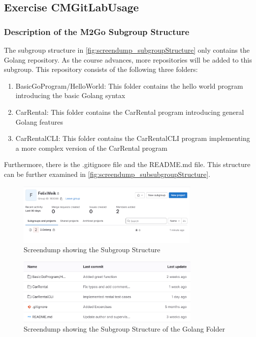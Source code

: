 \label{sec:exercise_cm_gitlab_usage}

\subsection{Exercise CMGitLabUsage}

\subsubsection*{Description of the M2Go Subgroup Structure}
The subgroup structure in \autoref{fig:screendump_subgroupStructure} only contains the Golang repository.
As the course advances, more repositories will be added to this subgroup.
This repository consists of the following three folders:
\begin{enumerate}
    \item BasicGoProgram/HelloWorld: This folder contains the hello world program introducing the basic Golang syntax
    \item CarRental: This folder contains the CarRental program introducing general Golang features
    \item CarRentalCLI: This folder contains the CarRentalCLI program implementing a more complex version of the CarRental program
\end{enumerate}
Furthermore, there is the .gitignore file and the README.md file.
This structure can be further examined in \autoref{fig:screendump_subsubgroupStructure}.

\begin{figure}[h]
    \centering
    \includegraphics[width=0.8\textwidth]{figures/goLang/golang_personalSubgroupStructure.png}
    \caption{Screendump showing the Subgroup Structure}
    \label{fig:screendump_subgroupStructure}
\end{figure}

\begin{figure}
    \centering
    \includegraphics[width=0.8\textwidth]{figures/goLang/golang_personalSubsubgroupStructure.png}
    \caption{Screendump showing the Subgroup Structure of the Golang Folder}
    \label{fig:screendump_subsubgroupStructure}
\end{figure}

